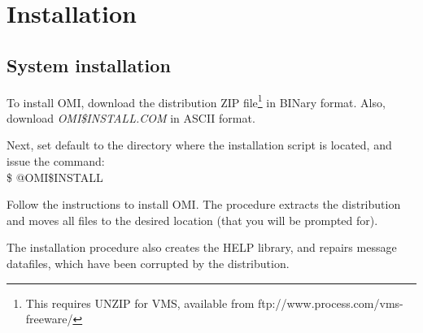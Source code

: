 \documentclass[a4paper]{book}
\newcommand{\vs}{\vspace{3mm}}
\renewcommand{\indent}{\hspace*{5mm}}
\begin{document}
\chapter{Installation}
\label{sec:installationrmed}

\section{System installation}
\label{subsec:system}

To install OMI, download the distribution ZIP file\footnote{ This requires UNZIP for VMS, available from
ftp://www.process.com/vms-freeware/} in BINary format.
Also, download \textsl{OMI{\$}INSTALL.COM} in ASCII format.
 
Next, set default to the directory where the installation
script is located, and issue the command: \\
\indent \textsf{{\$} @OMI{\$}INSTALL}
 

\vs

Follow the instructions to install OMI.
The procedure extracts the distribution and moves all
files to the desired location (that you will be prompted for).
 
The installation procedure also creates the HELP library,
and repairs message datafiles, which have been corrupted
by the distribution.
\end{document}

